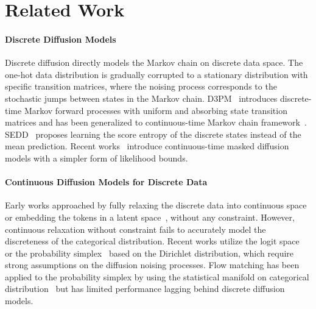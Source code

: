 \section{Related Work}

\paragraph{Discrete Diffusion Models}
Discrete diffusion directly models the Markov chain on discrete data space. The one-hot data distribution is gradually corrupted to a stationary distribution with specific transition matrices, where the noising process corresponds to the stochastic jumps between states in the Markov chain.
D3PM~\citep{austin2021d3pm} introduces discrete-time Markov forward processes with uniform and absorbing state transition matrices and has been generalized to continuous-time Markov chain framework~\citep{campbell2022ctmc}.
SEDD~\citep{lou2024sedd} proposes learning the score entropy of the discrete states instead of the mean prediction. 
Recent works~\citep{shi2024md4,sahoo2024simple} introduce continuous-time masked diffusion models with a simpler form of likelihood bounds.




\paragraph{Continuous Diffusion Models for Discrete Data}
Early works approached by fully relaxing the discrete data into continuous space~\citep{han2022ssd} or embedding the tokens in a latent space~\citep{li2022diffusion,dieleman2022continuous}, without any constraint.
However, continuous relaxation without constraint fails to accurately model the discreteness of the categorical distribution.
Recent works utilize the logit space~\citep{hoogeboom2021multinomial,graves2023bayesian} or the probability simplex~\citep{avdeyev2023dirichlet,stark2024dirichlet} based on the Dirichlet distribution, which require strong assumptions on the diffusion noising processes.
Flow matching has been applied to the probability simplex by using the statistical manifold on categorical distribution~\citep{cheng2024categorical,davis2024fisherflow} but has limited performance lagging behind discrete diffusion models.




